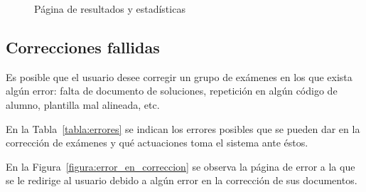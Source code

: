 \documentclass[a4paper, 12pt]{book}
\begin{document}
\begin{figure}
  \centering
  \caption{Página de resultados y estadísticas}
  \label{figura:resultados_y_estadisticas}
\end{figure}

\subsection{Correcciones fallidas}
\label{subsec:correcciones_fallidas}

Es posible que el usuario desee corregir un grupo de exámenes en los que exista
algún error: falta de documento de soluciones, repetición en algún código de alumno,
plantilla mal alineada, etc.

En la Tabla~\ref{tabla:errores} se indican los errores posibles que se pueden dar en la corrección
de exámenes y qué actuaciones toma el sistema ante éstos.

En la Figura~\ref{figura:error_en_correccion} se observa la página de error
a la que se le redirige al usuario
debido a algún error en la corrección de sus documentos.
\end{document}
